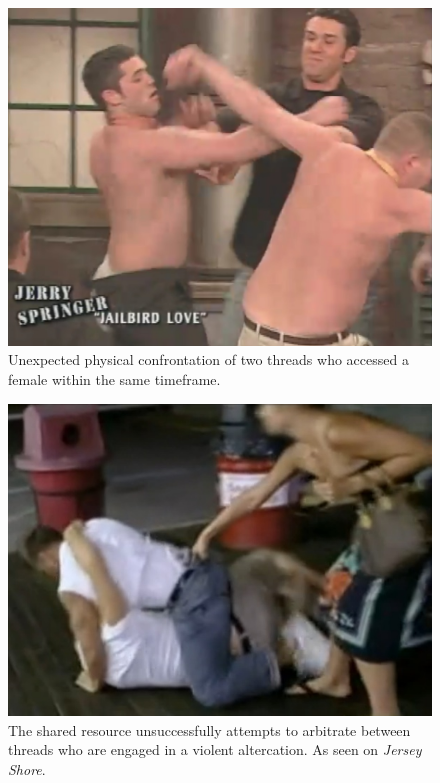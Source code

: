 \documentclass[nocopyrightspace,10pt]{sigplanconf}
\begin{document}
\begin{figure}[tbh!]
\centering
\includegraphics[width=\linewidth]{jerry-springer.jpg}
\caption{Unexpected physical confrontation of two threads who accessed a female within the same timeframe.}
\label{fig:springer}
\end{figure}

\begin{figure}[tbh!]
\centering
\includegraphics[width=\linewidth]{jersey-shore.jpg}
\caption{The shared resource unsuccessfully attempts to arbitrate between threads who are engaged in a violent altercation. As seen on \emph{Jersey Shore}.}
\label{fig:jersey}
\end{figure}
\end{document}
